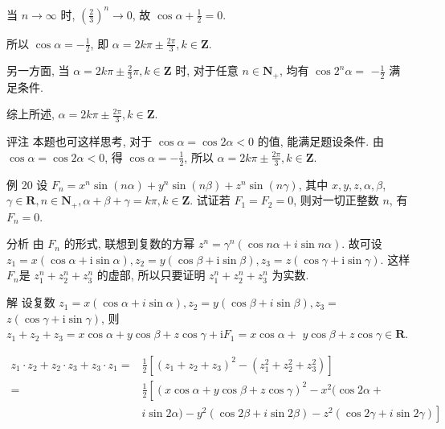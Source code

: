 	当 $n \rightarrow \infty$ 时, $\left(\frac{2}{3}\right)^{n} \rightarrow 0$, 故 $\cos \alpha+\frac{1}{2}=0$.

	所以 $\cos \alpha=-\frac{1}{2}$, 即 $\alpha=2 k \pi \pm \frac{2 \pi}{3}, k \in \mathbf{Z}$.

	另一方面, 当 $\alpha=2 k \pi \pm \frac{2}{3} \pi, k \in \mathbf{Z}$ 时, 对于任意 $n \in \mathbf{N}_{+}$, 均有 $\cos 2^{n} \alpha=$ $-\frac{1}{2}$ 满足条件.

	综上所述, $\alpha=2 k \pi \pm \frac{2 \pi}{3}, k \in \mathbf{Z}$.

	评注 本题也可这样思考, 对于 $\cos \alpha=\cos 2 \alpha<0$ 的值, 能满足题设条件. 由 $\cos \alpha=\cos 2 \alpha<0$, 得 $\cos \alpha=-\frac{1}{2}$, 所以 $\alpha=2 k \pi \pm \frac{2 \pi}{3}, k \in \mathbf{Z}$.

	例 20 设 $F_{n}=x^{n} \sin (n \alpha)+y^{n} \sin (n \beta)+z^{n} \sin (n \gamma)$, 其中 $x, y, z, \alpha, \beta$, $\gamma \in \mathbf{R}, n \in \mathbf{N}_{+}, \alpha+\beta+\gamma=k \pi, k \in \mathbf{Z}$. 试证若 $F_{1}=F_{2}=0$, 则对一切正整数 $n$, 有 $F_{n}=0$.

	分析 由 $F_{n}$ 的形式, 联想到复数的方幂 $z^{n}=\gamma^{n}(\cos n \alpha+i \sin n \alpha)$. 故可设 $z_{1}=x(\cos \alpha+\mathrm{i} \sin \alpha), z_{2}=y(\cos \beta+\mathrm{i} \sin \beta), z_{3}=z(\cos \gamma+\mathrm{i} \sin \gamma)$. 这样 $F_{n}$是 $z_{1}^{n}+z_{2}^{n}+z_{3}^{n}$ 的虚部, 所以只要证明 $z_{1}^{n}+z_{2}^{n}+z_{3}^{n}$ 为实数.

	解 设复数 $z_{1}=x(\cos \alpha+i \sin \alpha), z_{2}=y(\cos \beta+i \sin \beta), z_{3}=$ $z(\cos \gamma+\mathrm{i} \sin \gamma)$, 则 $z_{1}+z_{2}+z_{3}=x \cos \alpha+y \cos \beta+z \cos \gamma+\mathrm{i} F_{1}=x \cos \alpha+$ $y \cos \beta+z \cos \gamma \in \mathbf{R}$.

	$$
		\begin{aligned}
			z_{1} \cdot z_{2}+z_{2} \cdot z_{3}+z_{3} \cdot z_{1}= & \frac{1}{2}\left[\left(z_{1}+z_{2}+z_{3}\right)^{2}-\left(z_{1}^{2}+z_{2}^{2}+z_{3}^{2}\right)\right] \\
			=                                                      & \frac{1}{2}\left[(x \cos \alpha+y \cos \beta+z \cos \gamma)^{2}-x^{2}(\cos 2 \alpha+\right.           \\
			                                                       & \left.i \sin 2 \alpha)-y^{2}(\cos 2 \beta+i \sin 2 \beta)-z^{2}(\cos 2 \gamma+i \sin 2 \gamma)\right]
		\end{aligned}
	$$

